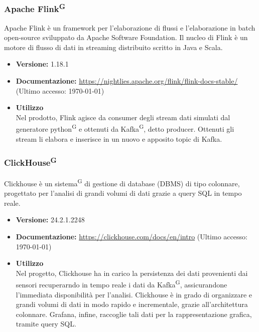 \documentclass[8pt]{article}
\newcommand{\glossterm}[1]{#1\textsuperscript{G}} %
\begin{document}
\subsubsection{Apache \glossterm{Flink}}
Apache Flink è un framework per l'elaborazione di flussi e l'elaborazione in batch open-source sviluppato da Apache Software Foundation. Il nucleo di Flink è un motore di flusso di dati in streaming distribuito scritto in Java e Scala.
\begin{itemize}
    \item \textbf{Versione:} 1.18.1
    \item \textbf{Documentazione:} \href{https://nightlies.apache.org/flink/flink-docs-stable/}{\color{myblue}https://nightlies.apache.org/flink/flink-docs-stable/} (Ultimo accesso: \today)
    \item \textbf{Utilizzo}
    \\Nel prodotto, Flink agisce da consumer degli stream dati simulati dal generatore \glossterm{python} e ottenuti da \glossterm{Kafka}, detto producer. Ottenuti gli stream li elabora e inserisce in un nuovo e apposito topic di Kafka.
    \end{itemize}
\subsubsection{\glossterm{ClickHouse}}
Clickhouse è un \glossterm{sistema} di gestione di database (DBMS) di tipo colonnare,
progettato per l’analisi di grandi volumi di dati grazie a query SQL in tempo reale.
\begin{itemize}
    \item \textbf{Versione:} 24.2.1.2248
    \item \textbf{Documentazione:} \href{https://clickhouse.com/docs/en/intro}{\color{myblue}https://clickhouse.com/docs/en/intro} (Ultimo accesso: \today)
    \item \textbf{Utilizzo}
    \\Nel progetto, Clickhouse ha in carico la persistenza dei dati provenienti dai sensori recuperarndo in tempo reale i dati da \glossterm{Kafka}, assicurandone l'immediata disponibilità per l’analisi.
    Clickhouse è in grado di organizzare e grandi volumi di dati in modo rapido e incrementale, grazie all'architettura colonnare.
    Grafana, infine, raccoglie tali dati per la rappresentazione grafica, tramite query SQL.
\end{itemize}
\end{document}
